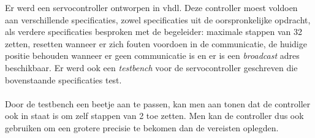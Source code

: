Er werd een servocontroller ontworpen in \gls{vhdl}. Deze controller moest voldoen aan verschillende specificaties, zowel specificaties uit de oorspronkelijke opdracht, als verdere specificaties besproken met de begeleider: maximale stappen van 32 zetten, resetten wanneer er zich fouten voordoen in de communicatie, de huidige positie behouden wanneer er geen communicatie is en er is een \textit{broadcast} adres beschikbaar. Er werd ook een \textit{testbench} voor de servocontroller geschreven die bovenstaande specificaties test.\\
\\
\noindent
Door de testbench een beetje aan te passen, kan men aan tonen dat de controller ook in staat is om zelf stappen van 2 toe zetten. Men kan de controller dus ook gebruiken om een grotere precisie te bekomen dan de vereisten oplegden.